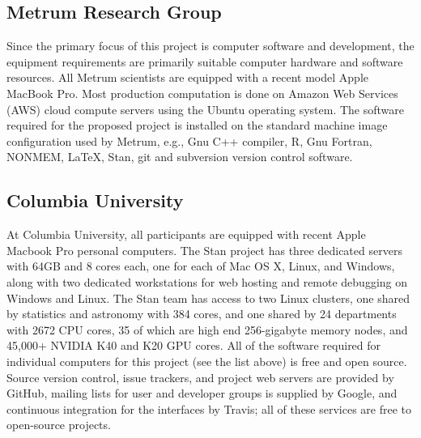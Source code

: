 

\subsection{Metrum Research Group}

Since the primary focus of this project is computer software and
development, the equipment requirements are primarily suitable
computer hardware and software resources. All Metrum scientists are
equipped with a recent model Apple MacBook Pro. Most production
computation is done on Amazon Web Services (AWS) cloud compute servers
using the Ubuntu operating system. The software required for the
proposed project is installed on the standard machine image
configuration used by Metrum, e.g., Gnu C++ compiler, R, Gnu Fortran,
NONMEM, LaTeX, Stan, git and subversion version control software.

\subsection{Columbia University}

At Columbia University, all participants are equipped with recent
Apple Macbook Pro personal computers.  The Stan project has three
dedicated servers with 64GB and 8 cores each, one for each of Mac OS
X, Linux, and Windows, along with two dedicated workstations for web
hosting and remote debugging on Windows and Linux.  The Stan team has
access to two Linux clusters, one shared by statistics and astronomy
with 384 cores, and one shared by 24 departments with 2672 CPU cores,
35 of which are high end 256-gigabyte memory nodes, and 45,000+ NVIDIA
K40 and K20 GPU cores.  All of the software required for individual
computers for this project (see the list above) is free and open
source.  Source version control, issue trackers, and project web
servers are provided by GitHub, mailing lists for user and developer
groups is supplied by Google, and continuous integration for the
interfaces by Travis;  all of these services are free to open-source
projects.



